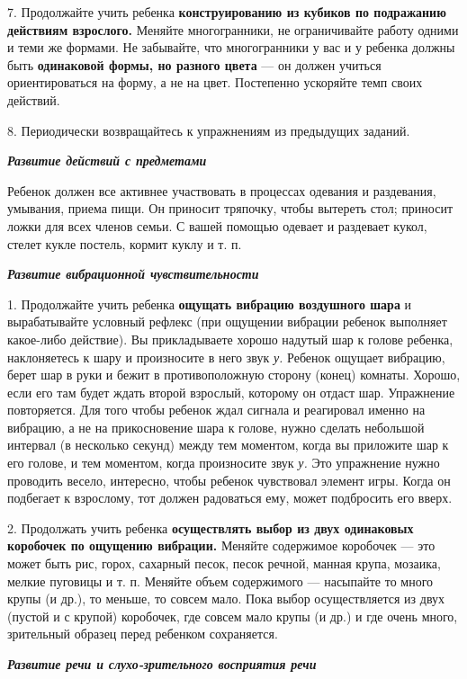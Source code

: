 \documentclass{book}
\renewcommand{\emph}[1]{\textit{#1}}
\begin{document}
7. Продолжайте учить ребенка \textbf{конструированию из кубиков по
подражанию действиям взрослого.} Меняйте многогранники, не ограничивайте
работу одними и теми же формами. Не забывайте, что многогранники у вас и
у ребенка должны быть \textbf{одинаковой формы, но разного цвета} --- он
должен учиться ориентироваться на форму, а не на цвет. Постепенно
ускоряйте темп своих действий.

8. Периодически возвращайтесь к упражнениям из предыдущих заданий.

\emph{\textbf{Развитие действий с предметами}}

Ребенок должен все активнее участвовать в процессах одевания и
раздевания, умывания, приема пищи. Он приносит тряпочку, чтобы вытереть
стол; приносит ложки для всех членов семьи. С вашей помощью одевает и
раздевает кукол, стелет кукле постель, кормит куклу и т. п.

\emph{\textbf{Развитие вибрационной чувствительности}}

1. Продолжайте учить ребенка \textbf{ощущать вибрацию воздушного шара} и
вырабатывайте условный рефлекс (при ощущении вибрации ребенок выполняет
какое-либо действие). Вы прикладываете хорошо надутый шар к голове
ребенка, наклоняетесь к шару и произносите в него звук \emph{у.} Ребенок
ощущает вибрацию, берет шар в руки и бежит в противоположную сторону
(конец) комнаты. Хорошо, если его там будет ждать второй взрослый,
которому он отдаст шар. Упражнение повторяется. Для того чтобы ребенок
ждал сигнала и реагировал именно на вибрацию, а не на прикосновение шара
к голове, нужно сделать небольшой интервал (в несколько секунд) между
тем моментом, когда вы приложите шар к его голове, и тем моментом, когда
произносите звук \emph{у.} Это упражнение нужно проводить весело,
интересно, чтобы ребенок чувствовал элемент игры. Когда он подбегает к
взрослому, тот должен радоваться ему, может подбросить его вверх.

2. Продолжать учить ребенка \textbf{осуществлять выбор из двух
одинаковых коробочек по ощущению вибрации.} Меняйте содержимое коробочек
--- это может быть рис, горох, сахарный песок, песок речной, манная
крупа, мозаика, мелкие пуговицы и т. п. Меняйте объем содержимого ---
насыпайте то много крупы (и др.), то меньше, то совсем мало. Пока выбор
осуществляется из двух (пустой и с крупой) коробочек, где совсем мало
крупы (и др.) и где очень много, зрительный образец перед ребенком
сохраняется.

\emph{\textbf{Развитие речи и слухо-зрительного восприятия речи}}
\end{document}
